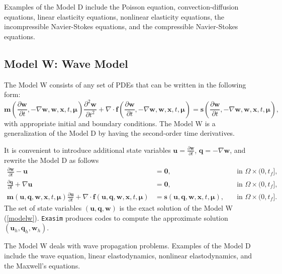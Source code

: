 \documentclass[11pt]{article}
\begin{document}
Examples of the Model D include the Poisson equation, convection-diffusion equations, linear elasticity equations, nonlinear elasticity equations, the incompressible Navier-Stokes equations, and the compressible Navier-Stokes equations. 

\subsection{Model W: Wave Model}


The Model W consists of any set of PDEs that can be written in the following form:
\begin{equation}
\label{modelw0}
\bm m \left(\frac{\partial \bm{w}}{\partial t}, - \nabla \bm w, \bm{w}, \bm x,t, \bm \mu\right) \frac{\partial^2 \bm{w}}{\partial t^2}  + \nabla \cdot \bm{f} \left(\frac{\partial \bm{w}}{\partial t}, - \nabla \bm w, \bm{w}, \bm x,t, \bm \mu\right) = \bm s \left(\frac{\partial \bm{w}}{\partial t}, - \nabla \bm w, \bm{w}, \bm x,t, \bm \mu\right), 
\end{equation}
with appropriate initial and boundary conditions. The Model W is a generalization of the Model D by having the second-order time derivatives.


It is convenient to introduce additional state variables $\bm u = \frac{\partial \bm{w}}{\partial t}$,  $\bm q = - \nabla \bm w$,  and rewrite the Model D as follows
\begin{subequations}
\label{modelw}
\begin{alignat}{2}
\frac{\partial \bm w}{\partial t} - \bm u & =  \bm 0,  & \quad \mbox{in } \Omega \times (0, t_f], \\
\frac{\partial \bm q}{\partial t} + \nabla \bm u & =  \bm 0,  & \quad \mbox{in } \Omega \times (0, t_f], \\
\bm m(\bm{u}, \bm q, \bm w, \bm x,t, \bm \mu) \frac{\partial \bm{u}}{\partial t} + \nabla \cdot \bm{f}(\bm{u}, \bm q, \bm w, \bm x,t, \bm \mu) &=  \bm s(\bm{u}, \bm q,  \bm w, \bm x,t, \bm \mu), & \quad \mbox{in } \Omega \times (0, t_f].  
\end{alignat}
\end{subequations}
The set of state variables $(\bm u, \bm q, \bm w)$ is the exact solution of the Model W (\ref{modelw}). \texttt{Exasim} produces codes to compute the approximate solution $(\bm u_h, \bm q_h, \bm w_h)$.


The Model W deals with wave propagation problems.  Examples of the Model D include the wave equation, linear elastodynamics, nonlinear elastodynamics, and the Maxwell's equations. 
\end{document}
